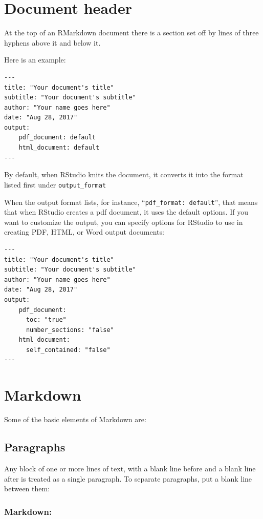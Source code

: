 \documentclass[
]{article}
\begin{document}
\hypertarget{document-header}{%
\section{Document header}\label{document-header}}

At the top of an RMarkdown document there is a section set off by lines
of three hyphens above it and below it.

Here is an example:

\begin{verbatim}
---
title: "Your document's title"
subtitle: "Your document's subtitle"
author: "Your name goes here"
date: "Aug 28, 2017"
output:
    pdf_document: default
    html_document: default
---
\end{verbatim}

By default, when RStudio knits the document, it converts it into the
format listed first under \texttt{output\_format}

When the output format lists, for instance,
``\texttt{pdf\_format:\ default}'', that means that when RStudio creates
a pdf document, it uses the default options. If you want to customize
the output, you can specify options for RStudio to use in creating PDF,
HTML, or Word output documents:

\begin{verbatim}
---
title: "Your document's title"
subtitle: "Your document's subtitle"
author: "Your name goes here"
date: "Aug 28, 2017"
output:
    pdf_document:
      toc: "true" 
      number_sections: "false"
    html_document:
      self_contained: "false"
---
\end{verbatim}

\hypertarget{markdown}{%
\section{Markdown}\label{markdown}}

Some of the basic elements of Markdown are:

\hypertarget{paragraphs}{%
\subsection{Paragraphs}\label{paragraphs}}

Any block of one or more lines of text, with a blank line before and a
blank line after is treated as a single paragraph. To separate
paragraphs, put a blank line between them:

\hypertarget{markdown-1}{%
\subsubsection{Markdown:}\label{markdown-1}}
\end{document}

